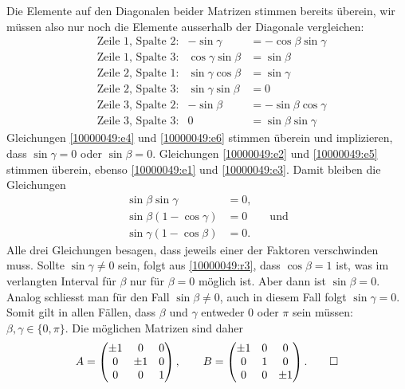 \begin{loesung}
\begin{teilaufgaben}
Die Elemente auf den Diagonalen beider Matrizen stimmen bereits
überein, wir müssen also nur noch die Elemente ausserhalb der
Diagonale vergleichen:
\begin{align}
&\text{Zeile $1$, Spalte $2$:}
&
-\sin\gamma&=-\cos\beta\sin\gamma
\label{10000049:e1}
\\
&\text{Zeile $1$, Spalte $3$:}
&
\cos\gamma\sin\beta&=\sin\beta
\label{10000049:e2}
\\
&\text{Zeile $2$, Spalte $1$:}
&
\sin\gamma\cos\beta&=\sin\gamma
\label{10000049:e3}
\\
&\text{Zeile $2$, Spalte $3$:}
&
\sin\gamma\sin\beta&=0
\label{10000049:e4}
\\
&\text{Zeile $3$, Spalte $2$:}
&
-\sin\beta&=-\sin\beta\cos\gamma
\label{10000049:e5}
\\
&\text{Zeile $3$, Spalte $3$:}
&
0&=\sin\beta\sin\gamma
\label{10000049:e6}
\end{align}
Gleichungen
\eqref{10000049:e4}
und
\eqref{10000049:e6}
stimmen überein und implizieren, dass $\sin\gamma=0$ oder $\sin\beta=0$.
Gleichungen
\eqref{10000049:e2}
und
\eqref{10000049:e5}
stimmen überein, ebenso
\eqref{10000049:e1}
und
\eqref{10000049:e3}.
Damit bleiben die Gleichungen
\begin{align}
\sin\beta   \sin\gamma &=0, \label{10000049:r1}\\
\sin\beta(1-\cos\gamma)&=0\qquad\text{und} \label{10000049:r2}\\
\sin\gamma(1-\cos\beta)&=0.\label{10000049:r3}
\end{align}
Alle drei Gleichungen besagen, dass jeweils einer der Faktoren verschwinden
muss.
Sollte $\sin\gamma\ne0$ sein, folgt aus \eqref{10000049:r3}, dass $\cos\beta=1$
ist, was im verlangten Interval für $\beta$ nur für $\beta=0$  möglich ist.
Aber dann ist $\sin\beta=0$.
Analog schliesst man für den Fall $\sin\beta\ne 0$, auch in diesem Fall folgt
$\sin\gamma=0$.
Somit gilt in allen Fällen, dass $\beta$ und $\gamma$ entweder $0$ oder
$\pi$ sein müssen: $\beta,\gamma\in\{0,\pi\}$.
Die möglichen Matrizen sind daher
\[
A=\begin{pmatrix}
\pm1&   0&0\\
   0&\pm1&0\\
   0&   0&1
\end{pmatrix},
\qquad
B=\begin{pmatrix}
\pm1&0&   0\\
   0&1&   0\\
   0&0&\pm1
\end{pmatrix}.
\qedhere
\]
\end{teilaufgaben}
\end{loesung}


